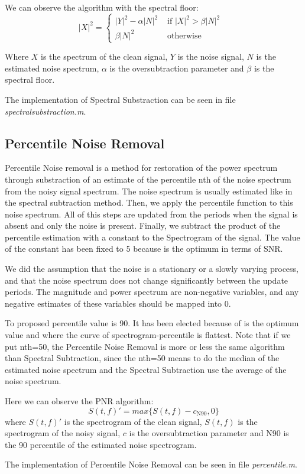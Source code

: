   We can observe the algorithm with the spectral floor:
  $$
  |X|^2 = \left\{  \begin{array}{rl}
    |Y|^2-\alpha |N|^2    &\mbox{ if  $|X|^2>\beta |N|^2$ } \\
    \beta |N|^2   &\mbox{ otherwise } 
  \end{array} \right.
  $$
  
  Where $X$ is the spectrum of the clean signal, $Y$ is the noise signal, $N$ is the estimated noise spectrum, $\alpha$ is the oversubtraction parameter and $\beta$ is the spectral floor.
  
  The implementation of Spectral Substraction can be seen in file \emph{spectralsubstraction.m}\cite{timegain}.

\subsection{Percentile Noise Removal}
  Percentile Noise removal is a method for restoration of the power spectrum through substraction of an estimate of the percentile nth of the noise spectrum from the noisy signal spectrum. The noise spectrum is usually estimated like in the spectral subtraction method. Then, we apply the percentile function to this noise spectrum. All of this steps are updated from the periods when the signal is absent and only the noise is present. Finally, we subtract the product of the percentile estimation with a constant to the Spectrogram of the signal. The value of the constant has been fixed to 5 because is the optimum in terms of SNR.

  We did the assumption that the noise is a stationary or a slowly varying process, and that the noise spectrum does not change significantly between the update periods. The magnitude and power spectrum are non-negative variables, and any negative estimates of these variables should be mapped into 0. 

  To proposed percentile value is 90. It has been elected because of is the optimum value and where the curve of spectrogram-percentile is flattest. Note that if we put nth=50, the Percentile Noise Removal is more or less the same algorithm than Spectral Subtraction, since the nth=50 means to do the median of the estimated noise spectrum and the Spectral Subtraction use the average of the noise spectrum.
  
  Here we can observe the PNR algorithm:
  $$ S(t,f)'= max\{S(t,f)- c_{\text{N90}},0\} $$
  where $S(t,f)'$ is the spectrogram of the clean signal, $S(t,f)$ is the spectrogram of the noisy signal, $c$ is the oversubtraction parameter and N90 is the 90 percentile of the estimated noise spectrogram.
  
  The implementation of Percentile Noise Removal can be seen in file \emph{percentile.m}\cite{percentile}.
